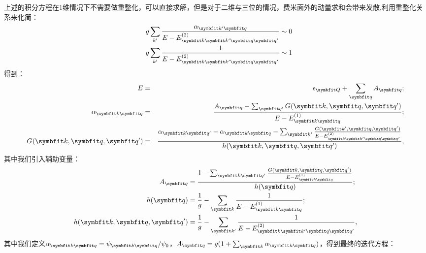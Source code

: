 上述的积分方程在1维情况下不需要做重整化，可以直接求解，但是对于二维与三位的情况，费米面外的动量求和会带来发散,利用重整化关系来化简：
\begin{equation}
\begin{split}
\quad g\sum_{k'} \frac{\alpha_{{\Vector{k'} }{\Vector{q} }}}{E-E^{(2)}_{\Vector{k}\Vector{k}'\Vector{q}\Vector{q}'}}\sim 0\\
\quad g\sum_{k'} \frac{1}{E-E^{(2)}_{\Vector{k}\Vector{k}'\Vector{q}\Vector{q}'}}\sim 1\\
\end{split}
\end{equation}
得到：
\begin{eqnarray}
E &=& \epsilon_{\Vector{Q} } + \sum_{\Vector{q}} A_{\Vector{q} };  \label{eq1}\\
{\alpha}_{\Vector{k} \Vector{q} } &=& \frac{ {A}_{\Vector{q}} -\sum_{\Vector{q}'} {G}(\Vector{k},\Vector{q},\Vector{q}') }{E-E^{(1)}_{\Vector{k} \Vector{q}}} ; \label{eq2}\\
{G}(\Vector{k},\Vector{q},\Vector{q}') &=& \frac{ {\alpha}_{\Vector{k} \Vector{q}'} - {\alpha}_{\Vector{k} \Vector{q} }  - \sum_{\Vector{k}'} \frac{ {G}(\Vector{k}',\Vector{q},\Vector{q}') }{ E-E^{(2)}_{\Vector{k}\Vector{k}'\Vector{q}\Vector{q}'} } }{h(\Vector{k},\Vector{q},\Vector{q}')}, \label{eq3}
\end{eqnarray}
其中我们引入辅助变量：
\begin{equation}
\begin{split}
{A}_{\Vector{q}} &= \frac{ 1- \sum_{\Vector{k} \Vector{q}'} \frac{{G}(\Vector{k},\Vector{q},\Vector{q}')}{E-E^{(1)}_{\Vector{k} \Vector{q}}}  }{h(\Vector{q})};\\
h(\Vector{q}) &= \frac{1}{g} - \sum_{\Vector{k}} \frac{1}{E-E^{(1)}_{\Vector{k} \Vector{q}}} %
;  \\
h(\Vector{k},\Vector{q},\Vector{q}') &= \frac{1}{g} - \sum_{\Vector{k}'} \frac{1}{E-E^{(2)}_{\Vector{k}\Vector{k}'\Vector{q}\Vector{q}'}}, %
\end{split}
\end{equation}
其中我们定义${\alpha}_{\Vector{k}\Vector{q}} = \psi_{\Vector{k}\Vector{q}}/ \psi_0$，${A}_{\Vector{q}} = g (1+\sum_{\Vector{k} }{\alpha}_{\Vector{k}\Vector{q}})$，得到最终的迭代方程：



